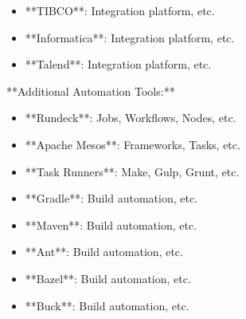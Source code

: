 \documentclass[11pt,a4paper]{article}
\begin{document}
\begin{itemize}
\item **TIBCO**: Integration platform, etc.
\end{itemize}

\begin{itemize}
\item **Informatica**: Integration platform, etc.
\end{itemize}

\begin{itemize}
\item **Talend**: Integration platform, etc.
\end{itemize}

**Additional Automation Tools:**

\begin{itemize}
\item **Rundeck**: Jobs, Workflows, Nodes, etc.
\end{itemize}

\begin{itemize}
\item **Apache Mesos**: Frameworks, Tasks, etc.
\end{itemize}

\begin{itemize}
\item **Task Runners**: Make, Gulp, Grunt, etc.
\end{itemize}

\begin{itemize}
\item **Gradle**: Build automation, etc.
\end{itemize}

\begin{itemize}
\item **Maven**: Build automation, etc.
\end{itemize}

\begin{itemize}
\item **Ant**: Build automation, etc.
\end{itemize}

\begin{itemize}
\item **Bazel**: Build automation, etc.
\end{itemize}

\begin{itemize}
\item **Buck**: Build automation, etc.
\end{itemize}
\end{document}
